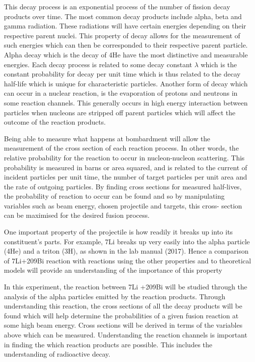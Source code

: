 \documentclass{article}
\begin{document}
This decay process is an exponential process of the number of fission decay products over time. The most common decay products include alpha, beta and gamma radiation. These radiations will have certain energies depending on their respective parent nuclei. This property of decay allows for the measurement of such energies which can then be corresponded to their respective parent particle. Alpha decay which is the decay of 4He have the most distinctive and measurable energies. Each decay process is related to some decay constant $\lambda$ which is the constant probability for decay per unit time which is thus related to the decay half-life which is unique for characteristic particles.
Another form of decay which can occur in a nuclear reaction, is the evaporation of protons and neutrons in some reaction channels.  This generally occurs in high energy interaction between particles when nucleons are stripped off parent particles which will affect the outcome of the reaction products.

Being able to measure what happens at bombardment will allow the measurement of the cross section of each reaction process. In other words, the relative probability for the reaction to occur in nucleon-nucleon scattering. This probability is measured in barns or area squared, and is related to the current of incident particles per unit time, the number of target particles per unit area and the rate of outgoing particles. By finding cross sections for measured half-lives, the probability of reaction to occur can be found and so by manipulating variables such as beam energy, chosen projectile and targets, this cross- section can be maximised for the desired fusion process. 

One important property of the projectile is how readily it breaks up into its constituent’s parts. For example, 7Li breaks up very easily into the alpha particle (4He) and a triton (3H), as shown in the lab manual (2017). Hence a comparison of 7Li+209Bi reaction with reactions using the other properties and to theoretical models will provide an understanding of the importance of this property

In this experiment, the reaction between 7Li +209Bi will be studied through the analysis of the alpha particles emitted by the reaction products. Through understanding this reaction, the cross sections of all the decay products will be found which will help determine the probabilities of a given fusion reaction at some high beam energy. Cross sections will be derived in terms of the variables above which can be measured.
Understanding the reaction channels is important in finding the which reaction products are possible. This includes the understanding of radioactive decay.
\end{document}
